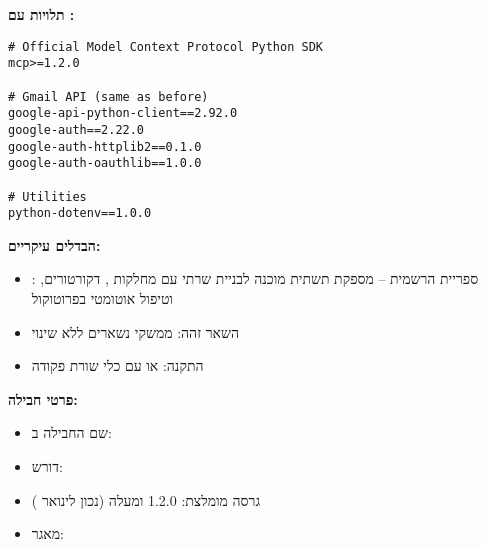 
\textbf{תלויות  עם :}

\begin{english}
\begin{verbatim}
# Official Model Context Protocol Python SDK
mcp>=1.2.0

# Gmail API (same as before)
google-api-python-client==2.92.0
google-auth==2.22.0
google-auth-httplib2==0.1.0
google-auth-oauthlib==1.0.0

# Utilities
python-dotenv==1.0.0
\end{verbatim}
\end{english}

\textbf{הבדלים עיקריים:}

\begin{itemize}
\item {}: ספריית  הרשמית – מספקת תשתית מוכנה לבניית שרתי  עם מחלקות , דקורטורים, וטיפול אוטומטי בפרוטוקול
\item השאר זהה: ממשקי  נשארים ללא שינוי
\item התקנה:  או  עם כלי שורת פקודה
\end{itemize}

\textbf{פרטי חבילה:}

\begin{itemize}
\item שם החבילה ב: 
\item דורש: 
\item גרסה מומלצת: \num{1.2.0} ומעלה (נכון לינואר )
\item מאגר: 
\end{itemize}
